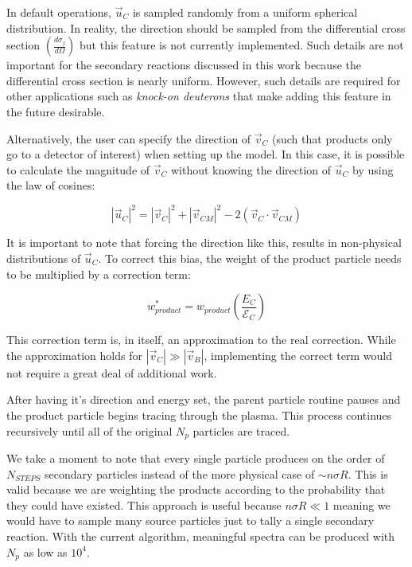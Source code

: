 	In default operations, $\vec{u}_C$ is sampled randomly from a uniform spherical distribution. In reality, the direction should be sampled from the differential cross section $(\frac{d\sigma_{j}}{d\Omega})$ but this feature is not currently implemented. Such details are not important for the secondary reactions discussed in this work because the differential cross section is nearly uniform. However, such details are required for other applications such as \emph{knock-on deuterons} \cite{bibid} that make adding this feature in the future desirable.
	
	Alternatively, the user can specify the direction of $\vec{v}_C$ (such that products only go to a detector of interest) when setting up the model. In this case, it is possible to calculate the magnitude of $\vec{v}_C$ without knowing the direction of $\vec{u}_C$ by using the law of cosines:
	
	\begin{equation}
		|\vec{u}_C|^2 = |\vec{v}_C|^2 + |\vec{v}_{CM}|^2 - 2\left(\vec{v}_C\cdot\vec{v}_{CM}\right)
	\end{equation}

	It is important to note that forcing the direction like this, results in non-physical distributions of $\vec{u}_C$. To correct this bias, the weight of the product particle needs to be multiplied by a correction term: \cite{bibid}
	
	\begin{equation}
		w^*_{product} = w_{product} \left(\frac{E_C}{\mathcal{E}_C}\right)
	\end{equation}  

	This correction term is, in itself, an approximation to the real correction. While the approximation holds for $|\vec{v}_C|\gg|\vec{v}_B|$, implementing the correct term would not require a great deal of additional work.
	
	After having it's direction and energy set, the parent particle routine pauses and the product particle begins tracing through the plasma. This process continues recursively until all of the original $N_p$ particles are traced. 
	
	We take a moment to note that every single particle produces on the order of $N_{STEPS}$ secondary particles instead of the more physical case of $\sim n\sigma R$.  This is valid because we are weighting the products according to the probability that they could have existed. This approach is useful because $n\sigma R \ll 1$ meaning we would have to sample many source particles just to tally a single secondary reaction. With the current algorithm, meaningful spectra can be produced with $N_p$ as low as $10^4$. 


